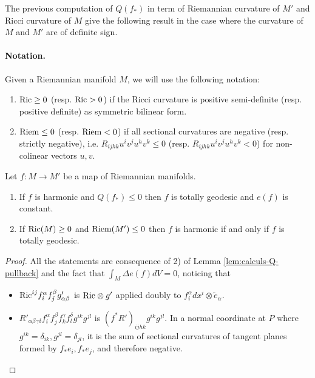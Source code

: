 The previous computation of \(Q(f_*)\) in term of Riemannian curvature of \(M'\) and
Ricci curvature of \(M\) give the following result in the case where the curvature of \(M\) and \(M'\) are of definite sign.

\paragraph{Notation.}
\label{sec:org379ca36}
Given a Riemannian manifold \(M\), we will use the following notation:
\begin{enumerate}
\item \({\rm Ric} \geq 0\) (resp. \({\rm Ric} > 0\)) if the Ricci curvature is positive
semi-definite (resp. positive definite) as symmetric bilinear form.
\item \({\rm Riem} \leq 0\) (resp. \({\rm Riem} < 0\)) if all sectional curvatures are
negative (resp. strictly negative), i.e. \(R_{ijhk} u^i v^j
   u^h v^k \leq 0\) (resp. \(R_{ijhk} u^i v^j
   u^h v^k < 0\)) for non-colinear vectors \(u,v\).
\end{enumerate}

\begin{corollary}
\label{cor:signed-curvature}
Let \(f: M \longrightarrow M'\) be a map of Riemannian manifolds.
\begin{enumerate}
\item If \(f\) is harmonic and \(Q(f_*) \leq 0\) then \(f\) is totally geodesic and \(e(f)\) is constant.
\item If \({\rm Ric}(M) \geq 0\) and \({\rm Riem}(M')\leq 0\) then \(f\) is harmonic if
and only if \(f\) is totally geodesic.
\end{enumerate}
\end{corollary}

\begin{proof}
All the statements are consequence of 2) of Lemma \ref{lem:calculs-Q-pullback} and the fact
that \(\int_M \Delta e(f)dV = 0\), noticing that
\begin{itemize}
\item \({\rm Ric}^{ij}f^\alpha_i f^\beta_j g'_{\alpha\beta}\) is \({\rm Ric}\otimes g'\)
applied doubly to \(f_i^\alpha dx^i\otimes\tilde e_\alpha\).
\item \(R'_{\alpha\beta\gamma\delta} f^\alpha_i f^\beta_j f^\gamma_k f^\delta_l
   g^{ik}g^{jl}\) is \((f^* R')_{ijhk}g^{ik}g^{jl}\). In a normal coordinate at \(P\)
where \(g^{ik}=\delta_{ik}, g^{jl}=\delta_{jl}\), it is the sum of sectional curvatures of tangent
planes formed by \(f_*e_i, f_*e_j\), and therefore negative.
\end{itemize}
\end{proof}



